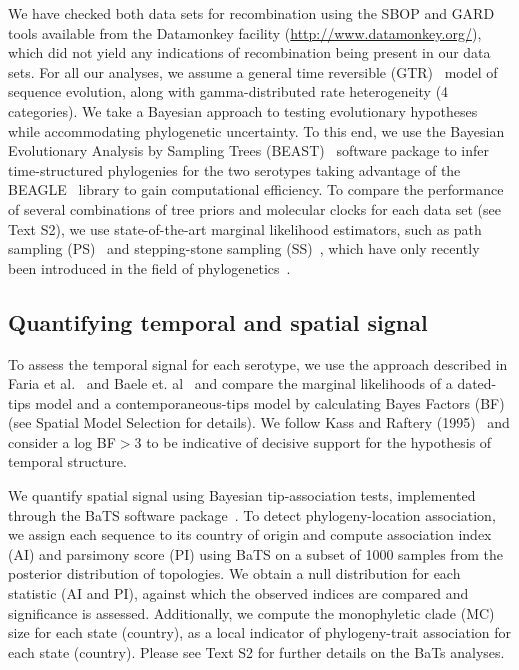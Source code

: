 \documentclass[10pt]{article}
\begin{document}
We have checked both data sets for recombination using the SBOP and GARD~\cite{sbpgard} tools available from the Datamonkey facility (\url{http://www.datamonkey.org/}), which did not yield any indications of recombination being present in our data sets.
For all our analyses, we assume a general time reversible (GTR)~\cite{Tavare1986} model of sequence evolution, along with gamma-distributed rate heterogeneity (4 categories).
We take a Bayesian approach to testing evolutionary hypotheses while accommodating phylogenetic uncertainty. 
To this end, we use the Bayesian Evolutionary Analysis by Sampling Trees (BEAST)~\cite{beast2012} software package to infer time-structured phylogenies for the two serotypes taking advantage of the BEAGLE~\cite{BEAGLE} library to gain computational efficiency.
To compare the performance of several combinations of tree priors and molecular clocks for each data set (see Text S2), we use state-of-the-art marginal likelihood estimators, such as path sampling (PS)~\cite{LartillotPhilippe} and stepping-stone sampling (SS)~\cite{Xie}, which have only recently been introduced in the field of phylogenetics~\cite{LartillotPhilippe, Xie, Baele2012, Baele2013a, Baele2013b, Baele2013c}.

\subsection*{Quantifying temporal and spatial signal} 

To assess the temporal signal for each serotype, we use the approach described in Faria et al.~\cite{Faria2012} and Baele et. al~\cite{Baele2012} and compare the marginal likelihoods of a dated-tips model and a contemporaneous-tips model by calculating Bayes Factors (BF)~\cite{Suchard2001, suchard2005models} (see Spatial Model Selection for details).
We follow Kass and Raftery (1995)~\cite{KassRaftery1995} and consider a log BF$>$3 to be indicative of decisive support for the hypothesis of temporal structure.

We quantify spatial signal using Bayesian tip-association tests, implemented through the BaTS software package~\cite{bats}.
To detect phylogeny-location association, we assign each sequence to its country of origin and compute association index (AI) and parsimony score (PI) using BaTS on a subset of 1000 samples from the posterior distribution of topologies.
We obtain a null distribution for each statistic (AI and PI), against which the observed indices are compared and significance is assessed.
Additionally, we compute the monophyletic clade (MC) size for each state (country), as a local indicator of phylogeny-trait association for each state (country).
Please see Text S2 for further details on the BaTs analyses.
\end{document}
